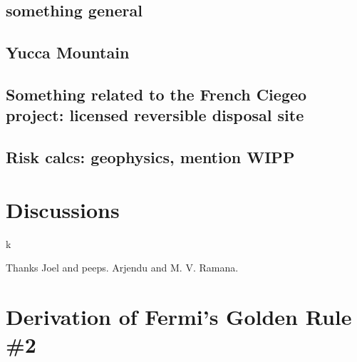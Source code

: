 \documentclass[preprint,aip,pra]{revtex4-1}
\begin{document}
    \subsection{something general}
    \subsection{Yucca Mountain}
    \subsection{Something related to the French Ciegeo project: licensed reversible disposal site}
    \subsection{Risk calcs: geophysics, mention WIPP}

\section{Discussions}

k
\begin{acknowledgments}
Thanks Joel and peeps. Arjendu and M. V. Ramana.
\end{acknowledgments}

\pagebreak


\appendix
\section{Derivation of Fermi's Golden Rule \#2}
\label{a:fermi}
\end{document}
